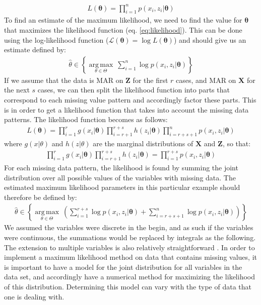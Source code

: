 \documentclass[../thesis.tex]{subfiles}
\begin{document}
\begin{align}
    L(\boldsymbol{\theta}) = \prod_{i=1}^n p(x_i, z_i | \boldsymbol{\theta})
    \label{eq:likelihood}
\end{align}
\noindent To find an estimate of the maximum likelihood, we need to find the value for $\boldsymbol{\theta}$ that maximizes the likelihood function (eq. \ref{eq:likelihood}). This can be done using the log-likelihood function ($\mathcal{L} (\boldsymbol{\theta}) = \log L(\boldsymbol{\theta})$) and should give us an estimate defined by:
\begin{align}
    {\displaystyle {\hat {\theta }}\in \left \{{\underset {\theta \in \Theta }{\operatorname {arg\,max} }}\ \sum_{i=1}^n\log p (x_i, z_i | \boldsymbol{\theta})\right \}}
\end{align}
\noindent If we assume that the data is MAR on $\boldsymbol{Z}$ for the first $r$ cases, and MAR on $\boldsymbol{X}$ for the next $s$ cases, we can then split the likelihood function into parts that correspond to each missing value pattern and accordingly factor these parts. This is in order to get a likelihood function that takes into account the missing data patterns. The likelihood function becomes as follows:
\newpage
\begin{align}
    L(\boldsymbol{\theta}) = \prod_{i=1}^r g(x_i | \boldsymbol{\theta})\prod_{i=r+1}^{r+s} h(z_i | \boldsymbol{\theta})\prod_{i=r+s+1}^n p(x_i, z_i | \boldsymbol{\theta}) 
\end{align}
\noindent where $g(x | \theta)$ and $h(z | \theta)$ are the marginal distributions of $\boldsymbol{X}$ and $\boldsymbol{Z}$, so that:
\begin{align}
    \prod_{i = 1}^r g(x_i | \boldsymbol{\theta}) \prod_{i = r + 1}^{r + s} h(z_i | \boldsymbol{\theta}) = \prod_{i=1}^{r+s} p(x_i, z_i | \boldsymbol{\theta})
\end{align}
\noindent For each missing data pattern, the likelihood is found by summing the joint distribution over all possible values of the variables with missing data. The estimated maximum likelihood parameters in this particular example should therefore be defined by:
\begin{align}
    {\displaystyle {\hat {\theta }}\in \left \{{\underset {\theta \in \Theta }{\operatorname {arg\,max} }}\ \left(\sum_{i=1}^{r+s}\log p(x_i, z_i | \boldsymbol{\theta}) + \sum_{i=r+s+1}^n\log p (x_i, z_i | \boldsymbol{\theta})\right)  \right\}}
\end{align}
\noindent We assumed the variables were discrete in the begin, and as such if the variables were continuous, the summations would be replaced by integrals as the following. The extension to multiple variables is also relatively straightforward \citep{allison1999missing}. In order to implement a maximum likelihood method on data that contains missing values, it is important to have a model for the joint distribution for all variables in the data set, and accordingly have a numerical method for maximizing the likelihood of this distribution. Determining this model can vary with the type of data that one is dealing with.\\
\end{document}
